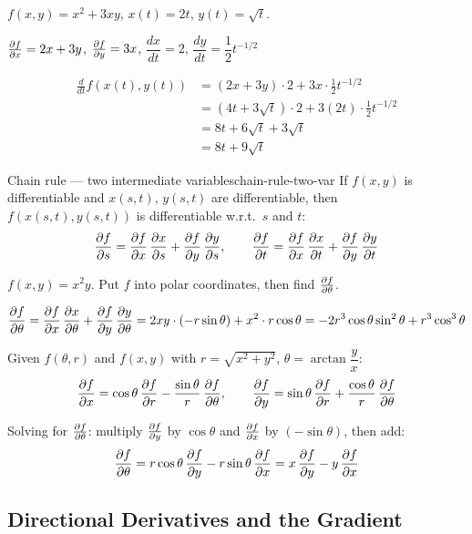 \begin{example}
  $f(x,y)=x^{2}+3xy$, \; $x(t)=2t$, \; $y(t)=\sqrt{t}$.

  $\frac{\partial f}{\partial x}=2x+3y$, \; $\frac{\partial f}{\partial y}=3x$, \;
  $\dfrac{dx}{dt}=2$, \; $\dfrac{dy}{dt}=\dfrac{1}{2}t^{-1/2}$

  \begin{align*}
    \frac{d}{dt}f(x(t),y(t))
     & = (2x+3y)\cdot 2 + 3x\cdot\tfrac{1}{2}t^{-1/2}           \\
     & = (4t+3\sqrt{t})\cdot 2 + 3(2t)\cdot\tfrac{1}{2}t^{-1/2} \\
     & = 8t+6\sqrt{t}+3\sqrt{t}                                 \\
     & = 8t+9\sqrt{t}
  \end{align*}
\end{example}

\begin{theorem}{Chain rule — two intermediate variables}{chain-rule-two-var}
  If $f(x,y)$ is differentiable and $x(s,t)$, $y(s,t)$ are differentiable,
  then $f(x(s,t),y(s,t))$ is differentiable w.r.t.\ $s$ and $t$:
  \[
    \frac{\partial f}{\partial s} = \frac{\partial f}{\partial x}\,\frac{\partial x}{\partial s}+\frac{\partial f}{\partial y}\,\frac{\partial y}{\partial s},
    \qquad
    \frac{\partial f}{\partial t} = \frac{\partial f}{\partial x}\,\frac{\partial x}{\partial t}+\frac{\partial f}{\partial y}\,\frac{\partial y}{\partial t}
  \]
\end{theorem}

\begin{example}
  $f(x,y)=x^{2}y$. Put $f$ into polar coordinates, then find $\frac{\partial f}{\partial \theta}$.

  \[
    \frac{\partial f}{\partial \theta}
    = \frac{\partial f}{\partial x}\,\frac{\partial x}{\partial \theta}+\frac{\partial f}{\partial y}\,\frac{\partial y}{\partial \theta}
    = 2xy\cdot(-r\sin\theta)+x^{2}\cdot r\cos\theta
    = -2r^{3}\cos\theta\sin^{2}\theta+r^{3}\cos^{3}\theta
  \]
\end{example}

\begin{example}
  Given $f(\theta,r)$ and $f(x,y)$ with
  $r=\sqrt{x^{2}+y^{2}}$, $\theta=\arctan\dfrac{y}{x}$:
  \[
    \frac{\partial f}{\partial x} = \cos\theta\,\frac{\partial f}{\partial r}-\frac{\sin\theta}{r}\,\frac{\partial f}{\partial \theta},
    \qquad
    \frac{\partial f}{\partial y} = \sin\theta\,\frac{\partial f}{\partial r}+\frac{\cos\theta}{r}\,\frac{\partial f}{\partial \theta}
  \]

  Solving for $\frac{\partial f}{\partial \theta}$:
  multiply $\frac{\partial f}{\partial y}$ by $\cos\theta$ and $\frac{\partial f}{\partial x}$ by $(-\sin\theta)$, then add:
  \[
    \frac{\partial f}{\partial \theta}
    = r\cos\theta\,\frac{\partial f}{\partial y}-r\sin\theta\,\frac{\partial f}{\partial x}
    = x\,\frac{\partial f}{\partial y}-y\,\frac{\partial f}{\partial x}
  \]
\end{example}

\subsection{Directional Derivatives and the Gradient}

